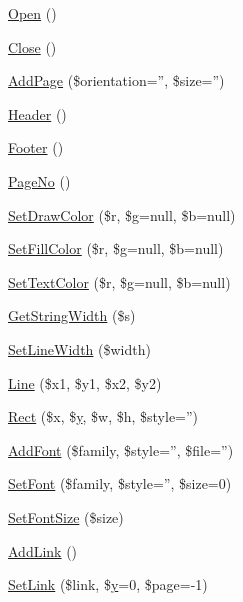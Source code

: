 \begin{DoxyCompactItemize}
\hyperlink{class_f_p_d_f_a6361408b654aa8ec619489c600492893}{Open} ()
\item 
\hyperlink{class_f_p_d_f_af6bcdd2acb114191b61065e85ff0b62c}{Close} ()
\item 
\hyperlink{class_f_p_d_f_a121a87a0cf4fcc43eb6972d40a4d54b1}{Add\-Page} (\$orientation='', \$size='')
\item 
\hyperlink{class_f_p_d_f_ab1bedba6d1753b9e3f18ed3820743fd6}{Header} ()
\item 
\hyperlink{class_f_p_d_f_aaa8da01869c5e5a75ff9150016dad08d}{Footer} ()
\item 
\hyperlink{class_f_p_d_f_af97a0239f79f597b5c88cc68b385f7af}{Page\-No} ()
\item 
\hyperlink{class_f_p_d_f_a2699cc6ff46c7cf2953e5e740f456d75}{Set\-Draw\-Color} (\$r, \$g=null, \$b=null)
\item 
\hyperlink{class_f_p_d_f_ac01941b00b99afca24dec97591665a3c}{Set\-Fill\-Color} (\$r, \$g=null, \$b=null)
\item 
\hyperlink{class_f_p_d_f_a59f12883ff2b60013eb0fe2c8c7e2dd5}{Set\-Text\-Color} (\$r, \$g=null, \$b=null)
\item 
\hyperlink{class_f_p_d_f_a55c99f3416c3788c759249b6315c948a}{Get\-String\-Width} (\$s)
\item 
\hyperlink{class_f_p_d_f_ac8e8290a814b06303c1dfff06ee24acb}{Set\-Line\-Width} (\$width)
\item 
\hyperlink{class_f_p_d_f_a408bfb653ed942e1e00d80ea9cdc139b}{Line} (\$x1, \$y1, \$x2, \$y2)
\item 
\hyperlink{class_f_p_d_f_af6b45f243c32ec04f1be28823b0cf15c}{Rect} (\$x, \$\hyperlink{example43___m_p_d_f_i__booklet_8php_a3f83be162d14f38451e1bc419fbbbcbc}{y}, \$w, \$h, \$style='')
\item 
\hyperlink{class_f_p_d_f_a7bfe3e0ed15ed966d8c41e36fb16553c}{Add\-Font} (\$family, \$style='', \$file='')
\item 
\hyperlink{class_f_p_d_f_a82acf7b1322a634829b56bb209045e1c}{Set\-Font} (\$family, \$style='', \$size=0)
\item 
\hyperlink{class_f_p_d_f_a47d041deb672f69250c936a234eead14}{Set\-Font\-Size} (\$size)
\item 
\hyperlink{class_f_p_d_f_aa4784e97caa10d7b5bd5b37cdb8de523}{Add\-Link} ()
\item 
\hyperlink{class_f_p_d_f_ab0137580cd5c01b4a48f4aec276706d4}{Set\-Link} (\$link, \$\hyperlink{example43___m_p_d_f_i__booklet_8php_a3f83be162d14f38451e1bc419fbbbcbc}{y}=0, \$page=-\/1)
\item 

\end{DoxyCompactItemize}
